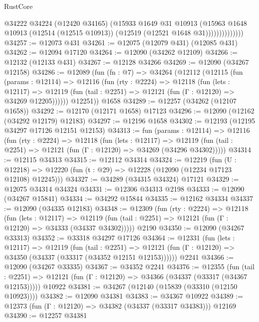 \begin{lexlean}{RustCore}
\begin{coremodule}
                        @34222
                        @34224
                        (@12420 @34165)
                        (@15933
                          @1649
                          @31
                          @10913
                          (@15963
                            @1648
                            @10913
                            (@12514 (@12515 @10913))
                            (@12519 (@12521 @1648 @31))))))))))))))
@34257 := @12073 @431
@34261 := @12075 (@12079 @431) (@12085 @431)
@34262 := @12094 @17120
@34264 := @12090 (@34262 @12109)
@34266 := @12132 (@12133 @431)
@34267 := @12128 @34266
@34269 := @12090 (@34267 @12158)
@34286 := @12089
    (fun (fn : @7) =>
    @34264
      (@12112
        (@12115
          (fun (params : @12114) =>
          @12116
            (fun (rty : @2224) =>
            @12118
              (fun (lets : @12117) =>
              @12119 (fun (tail : @2251) => @12121 (fun (Γ : @12120) => @34269 @12205))))))
        @12251))
    @1658
@34289 := @12257 (@34262 (@12107 @1658))
@34292 := @12170 (@12171 @1658) @17123
@34296 := @12090 (@12162 (@34292 @12179) @12183)
@34297 := @12196 @1658
@34302 := @12193 (@12195 @34297 @17126 @12151 @12153)
@34313 := fun (params : @12114) =>
  @12116
    (fun (rty : @2224) =>
    @12118
      (fun (lets : @12117) =>
      @12119 (fun (tail : @2251) => @12121 (fun (Γ : @12120) => @34269 (@34296 @34302)))))
@34314 := @12115 @34313
@34315 := @12112 @34314
@34324 := @12219
    (fun (U : @12218) => @12220 (fun (t : @29) => @12228 (@12090 (@12234 @17123 @12108) @12245)))
@34327 := @34289 (@34315 @34324) @17121
@34329 := @12075 @34314 @34324
@34331 := @12306 @34313 @2198
@34333 := @12090 (@34267 @15841)
@34334 := @34292 @15844
@34335 := @12162 @34334
@34337 := @12090 (@34335 @12183)
@34348 := @12309
    (fun (rty : @2224) =>
    @12118
      (fun (lets : @12117) =>
      @12119 (fun (tail : @2251) => @12121 (fun (Γ : @12120) => @34333 (@34337 @34302)))))
    @2190
@34350 := @12090 (@34267 @33313)
@34352 := @33318 @34297 @17126
@34364 := @12331
    (fun (lets : @12117) =>
    @12119
      (fun (tail : @2251) =>
      @12121 (fun (Γ : @12120) => @34350 (@34337 (@33317 (@34352 @12151 @12153))))))
    @2241
@34366 := @12090 (@34267 @33335)
@34367 := @34352 @2241
@34376 := @12355
    (fun (tail : @2251) => @12121 (fun (Γ : @12120) => @34366 (@34337 (@33317 (@34367 @12153)))))
    @10922
@34381 := @34267 (@12140 (@15839 (@33310 (@12150 @10923))))
@34382 := @12090 @34381
@34383 := @34367 @10922
@34389 := @12373 (fun (Γ : @12120) => @34382 (@34337 (@33317 @34383))) @12169
@34390 := @12257 @34381

\end{coremodule}
\end{lexlean}
